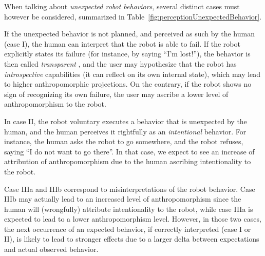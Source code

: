 \documentclass{frontiersSCNS} %
\begin{document}
When talking about \emph{unexpected robot behaviors}, several distinct cases
must however be considered, summarized in
Table~\ref{fig:perceptionUnexpectedBehavior}.

If the unexpected behavior is not planned, and perceived as such by the human
(case I), the human can interpret that the robot is able to fail. If the robot
explicitly states its failure (for instance, by saying ``I'm lost!''), the
behavior is then called \emph{transparent} \citep{kim_who_2006}, and the user may hypothesize that the
robot has \emph{introspective} capabilities (it can reflect on its own internal
state), which may lead to higher anthropomorphic projections.  On the
contrary, if the robot shows no sign of recognizing its own failure, the user
may ascribe a lower level of anthropomorphism to the robot.

In case II, the robot voluntary executes a behavior that is unexpected by the
human, and the human perceives it rightfully as an \emph{intentional} behavior.
For instance, the human asks the robot to go somewhere, and the robot refuses,
saying ``I do not want to go there''. In that case, we expect to see an increase
of attribution of anthropomorphism due to the human ascribing intentionality to the
robot.

Case IIIa and IIIb correspond to misinterpretations of the robot behavior. Case
IIIb may actually lead to an increased level of anthropomorphism since the human
will (wrongfully) attribute intentionality to the robot, while case IIIa is
expected to lead to a lower anthropomorphism level.  However, in those two
cases, the next occurrence of an expected behavior, if correctly interpreted
(case I or II), is likely to lead to stronger effects due to a larger delta
between expectations and actual observed behavior. 


%
%





%
%
%
%
%
%
\end{document}
